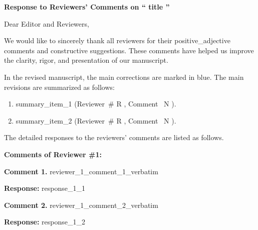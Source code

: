 \documentclass{article}
\begin{document}
\begin{center}
    \textbf{Response to Reviewers' Comments on ``{{ title }}''}
\end{center}

\noindent Dear Editor and Reviewers,

We would like to sincerely thank all reviewers for their {{ positive_adjective }} comments and constructive suggestions. These comments have helped us improve the clarity, rigor, and presentation of our manuscript.

In the revised manuscript, the main corrections are marked in {\color{blue}blue}. The main revisions are summarized as follows:

\begin{enumerate}[nosep]
    \item {{ summary_item_1 }} (Reviewer~\#{{ R }}, Comment~{{ N }}).
    \item {{ summary_item_2 }} (Reviewer~\#{{ R }}, Comment~{{ N }}).
\end{enumerate}

\noindent The detailed responses to the reviewers' comments are listed as follows.


\vspace{1.5em}

\noindent\textbf{\large Comments of Reviewer \#1:}

\vspace{1em}


\noindent\textbf{Comment 1.}
{{ reviewer_1_comment_1_verbatim }}

\vspace{0.5em}

{\color{blue}
\textbf{Response:}
{{ response_1_1 }}
}

\vspace{1.5em}


\noindent\textbf{Comment 2.}
{{ reviewer_1_comment_2_verbatim }}

\vspace{0.5em}

{\color{blue}
\textbf{Response:}
{{ response_1_2 }}
}

\vspace{1.5em}
\end{document}
